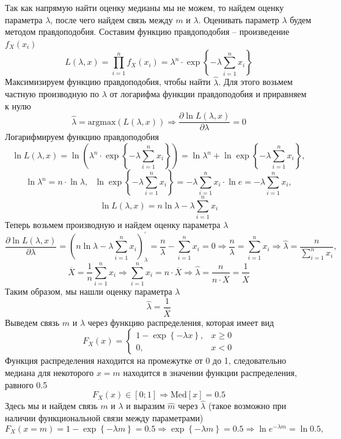 \documentclass[a4paper, 12pt]{article}
\begin{document}
    Так как напрямую найти оценку медианы мы не можем, то найдем оценку параметра $\lambda$, после чего найдем связь между $m$ и $\lambda$.
    Оценивать параметр $\lambda$ будем методом правдоподобия. Составим функцию правдоподобия -- произведение $f_X(x_i)$
    $$L\left(\lambda,x\right)=\prod_{i=1}^{n}f_X\left(x_i\right)=\lambda^n\cdot\exp{\left\{-\lambda\sum\limits_{i=1}^{n}x_i\right\}}$$
    Максимизируем функцию правдоподобия, чтобы найти $\hat{\lambda}$. Для этого возьмем частную производную по $\lambda$ от логарифма функции правдоподобия и приравняем к нулю
    $$\hat{\lambda}=\text{argmax}\left(L\left(\lambda,x\right)\right)\Rightarrow \dfrac{\partial\ln{L\left(\lambda,x\right)}}{\partial\lambda}=0$$
    Логарифмируем функцию правдоподобия
    $$\ln{L\left(\lambda,x\right)}=\ln{\left(\lambda^n\cdot\exp{\left\{-\lambda\sum\limits_{i=1}^{n}x_i\right\}}\right)}=
    \ln{\lambda^n}+\ln{\exp{\left\{-\lambda\sum\limits_{i=1}^{n}x_i\right\}}},$$
    $$\ln{\lambda^n}=n\cdot\ln{\lambda},\,\,\,\,\ln{\exp{\left\{-\lambda\sum\limits_{i=1}^{n}x_i\right\}}}=-\lambda\sum\limits_{i=1}^{n}x_i\cdot\ln{e}=-\lambda\sum\limits_{i=1}^{n}x_i,$$
    $$\ln{L\left(\lambda,x\right)}=n\ln{\lambda}-\lambda\sum\limits_{i=1}^{n}x_i$$
    Теперь возьмем производную и найдем оценку параметра $\lambda$
    $$\dfrac{\partial\ln{L\left(\lambda,x\right)}}{\partial\lambda}=\left(n\ln{\lambda}-\lambda\sum\limits_{i=1}^{n}x_i\right)_{\lambda}^{\prime}=
    \dfrac{n}{\lambda}-\sum\limits_{i=1}^{n}x_i=0\Rightarrow\dfrac{n}{\lambda}=\sum\limits_{i=1}^{n}x_i\Rightarrow\hat{\lambda}=\dfrac{n}{\sum_{i=1}^{n}x_i},$$
    $$\overline{X}=\dfrac{1}{n}\sum\limits_{i=1}^{n}x_i\Rightarrow\sum\limits_{i=1}^{n}x_i=n\cdot\overline{X}\Rightarrow\hat{\lambda}=\dfrac{n}{n\cdot\overline{X}}=\dfrac{1}{\overline{X}}$$
    Таким образом, мы нашли оценку параметра $\lambda$
    $$\hat{\lambda}=\dfrac{1}{\overline{X}}$$
    Выведем связь $m$ и $\lambda$ через функцию распределения, которая имеет вид
    $$F_X(x)=\begin{cases}
        1-\exp{\left\{-\lambda x\right\}},& x\geq0\\
        0,& x<0
    \end{cases}$$
    Функция распределения находится на промежутке от 0 до 1, следовательно медиана для некоторого $x=m$ находится в значении функции распределения, равного 0.5
    $$F_X(x)\in\left[0;1\right]\Rightarrow\text{Med}\left[x\right]=0.5$$
    Здесь мы и найдем связь $m$ и $\lambda$ и выразим $\hat{m}$ через $\hat{\lambda}$ (такое возможно при наличии функциональной связи между параметрами)
    $$F_X(x=m)=1-\exp{\left\{-\lambda m\right\}}=0.5\Rightarrow\exp{\left\{-\lambda m\right\}}=0.5\Rightarrow\ln{e^{-\lambda m}}=\ln{0.5},$$
\end{document}
